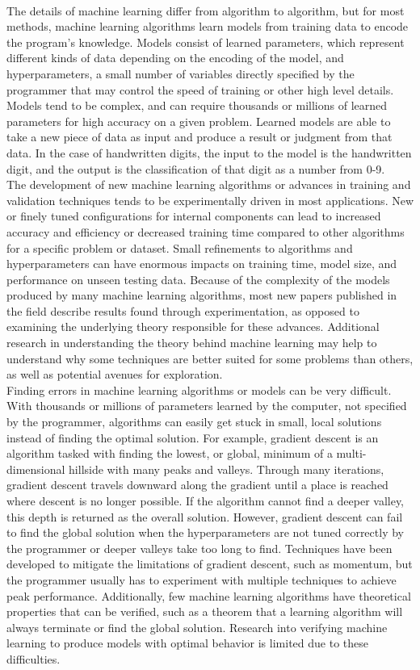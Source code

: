 \\The details of machine learning differ from algorithm to algorithm, but for most methods, machine learning algorithms learn models from training data to encode the program's knowledge. Models consist of learned parameters, which represent different kinds of data depending on the encoding of the model, and hyperparameters, a small number of variables directly specified by the programmer that may control the speed of training or other high level details. Models tend to be complex, and can require thousands or millions of learned parameters for high accuracy on a given problem. Learned models are able to take a new piece of data as input and produce a result or judgment from that data. In the case of handwritten digits, the input to the model is the handwritten digit, and the output is the classification of that digit as a number from 0-9.
\\The development of new machine learning algorithms or advances in training and validation techniques tends to be experimentally driven in most applications. New or finely tuned configurations for internal components can lead to increased accuracy and efficiency or decreased training time compared to other algorithms for a specific problem or dataset. Small refinements to algorithms and hyperparameters can have enormous impacts on training time, model size, and performance on unseen testing data. Because of the complexity of the models produced by many machine learning algorithms, most new papers published in the field describe results found through experimentation, as opposed to examining the underlying theory responsible for these advances. Additional research in understanding the theory behind machine learning may help to understand why some techniques are better suited for some problems than others, as well as potential avenues for exploration.
\\Finding errors in machine learning algorithms or models can be very difficult. With thousands or millions of parameters learned by the computer, not specified by the programmer, algorithms can easily get stuck in small, local solutions instead of finding the optimal solution. For example, gradient descent is an algorithm tasked with finding the lowest, or global, minimum of a multi-dimensional hillside with many peaks and valleys. Through many iterations, gradient descent travels downward along the gradient until a place is reached where descent is no longer possible. If the algorithm cannot find a deeper valley, this depth is returned as the overall solution. However, gradient descent can fail to find the global solution when the hyperparameters are not tuned correctly by the programmer or deeper valleys take too long to find. Techniques have been developed to mitigate the limitations of gradient descent, such as momentum, but the programmer usually has to experiment with multiple techniques to achieve peak performance. Additionally, few machine learning algorithms have theoretical properties that can be verified, such as a theorem that a learning algorithm will always terminate or find the global solution. Research into verifying machine learning to produce models with optimal behavior is limited due to these difficulties.
